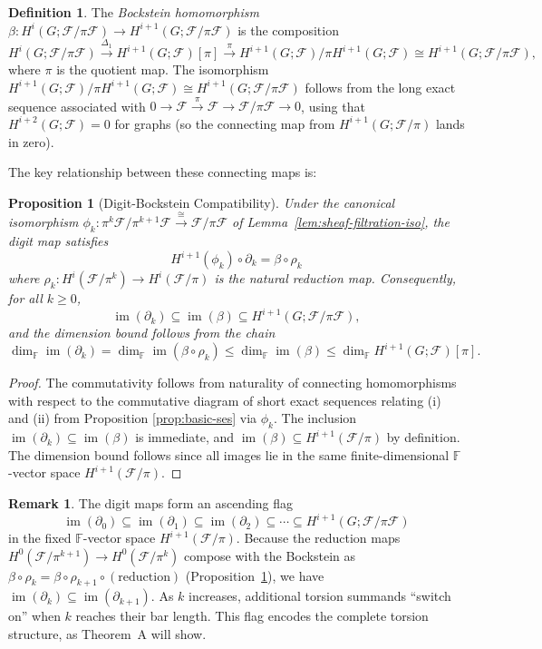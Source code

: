 \documentclass[11pt]{amsart}
\theoremstyle{plain}
\newtheorem{proposition}[theorem]{Proposition}
\theoremstyle{definition}
\newtheorem{definition}[theorem]{Definition}
\newtheorem{remark}[theorem]{Remark}
\newcommand{\unif}{\pi}                        %
\newcommand{\sheaf}[1]{\mathcal{#1}}                  %
\newcommand{\Bock}{\beta}            %
\newcommand{\Conn}[1]{\Delta_{#1}}   %
\newcommand{\Digit}[1]{\partial_{#1}}%
\DeclareMathOperator{\im}{im}                         %
\begin{document}
\begin{definition}
\label{def:bockstein-digit}
The \emph{Bockstein homomorphism} $\Bock: H^i(G; \sheaf{F}/\unif\sheaf{F}) \to 
H^{i+1}(G; \sheaf{F}/\unif\sheaf{F})$ is the composition
\[
H^i(G; \sheaf{F}/\unif\sheaf{F}) \xrightarrow{\Conn{1}} H^{i+1}(G; \sheaf{F})[\unif] 
\xrightarrow{\pi} H^{i+1}(G; \sheaf{F})/\unif H^{i+1}(G; \sheaf{F}) \cong 
H^{i+1}(G; \sheaf{F}/\unif\sheaf{F}),
\]
where $\pi$ is the quotient map. The isomorphism $H^{i+1}(G; \sheaf{F})/\unif H^{i+1}(G; \sheaf{F}) \cong H^{i+1}(G; \sheaf{F}/\unif\sheaf{F})$ follows from the long exact sequence associated with $0 \to \sheaf{F} \xrightarrow{\unif} \sheaf{F} \to \sheaf{F}/\unif\sheaf{F} \to 0$, using that $H^{i+2}(G;\sheaf{F}) = 0$ for graphs (so the connecting map from $H^{i+1}(G;\sheaf{F}/\unif)$ lands in zero).
\end{definition}

The key relationship between these connecting maps is:

\begin{proposition}[Digit-Bockstein Compatibility]
\label{prop:digit-bockstein}
Under the canonical isomorphism $\phi_k: \unif^k\sheaf{F}/\unif^{k+1}\sheaf{F} 
\xrightarrow{\cong} \sheaf{F}/\unif\sheaf{F}$ of Lemma~\ref{lem:sheaf-filtration-iso},
the digit map satisfies
\[
H^{i+1}(\phi_k) \circ \Digit{k} = \Bock \circ \rho_k
\]
where $\rho_k: H^i(\sheaf{F}/\unif^k) \to H^i(\sheaf{F}/\unif)$ is the natural 
reduction map. Consequently, for all $k \geq 0$,
\[
\im(\Digit{k}) \subseteq \im(\Bock) \subseteq H^{i+1}(G; \sheaf{F}/\unif\sheaf{F}),
\]
and the dimension bound follows from the chain
\[
\dim_{\mathbb{F}}\im(\Digit{k}) = \dim_{\mathbb{F}}\im(\Bock\circ \rho_k)
\le \dim_{\mathbb{F}}\im(\Bock)\le \dim_{\mathbb{F}} H^{i+1}(G;\sheaf{F})[\unif].
\]
\end{proposition}
\begin{proof}
The commutativity follows from naturality of connecting homomorphisms with respect 
to the commutative diagram of short exact sequences relating (i) and (ii) from 
Proposition \ref{prop:basic-ses} via $\phi_k$. The inclusion $\im(\Digit{k}) 
\subseteq \im(\Bock)$ is immediate, and $\im(\Bock) \subseteq H^{i+1}(\sheaf{F}/\unif)$ 
by definition. The dimension bound follows since all images lie in the same 
finite-dimensional $\mathbb{F}$-vector space $H^{i+1}(\sheaf{F}/\unif)$.
\end{proof}

\begin{remark}
\label{rem:digit-flag}
The digit maps form an ascending flag
\[
\im(\Digit{0}) \subseteq \im(\Digit{1}) \subseteq \im(\Digit{2}) \subseteq \cdots
\subseteq H^{i+1}(G; \sheaf{F}/\unif\sheaf{F})
\]
in the fixed $\mathbb{F}$-vector space $H^{i+1}(\sheaf{F}/\unif)$. Because the reduction maps $H^0(\sheaf{F}/\unif^{k+1}) \to H^0(\sheaf{F}/\unif^k)$ compose with the Bockstein as $\Bock \circ \rho_k = \Bock \circ \rho_{k+1} \circ (\text{reduction})$ (Proposition~\ref{prop:digit-bockstein}), we have $\im(\Digit{k}) \subseteq \im(\Digit{k+1})$. As $k$ increases, additional torsion summands ``switch on'' when $k$ reaches their bar length. This flag encodes the complete torsion structure, as Theorem~A will show.
\end{remark}
\end{document}
